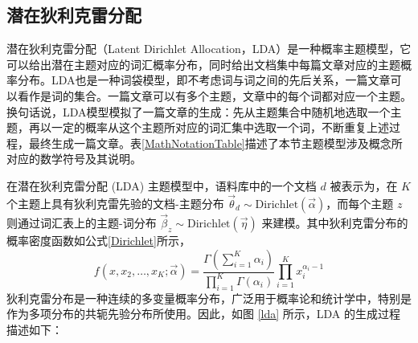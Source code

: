 \subsection{潜在狄利克雷分配}
潜在狄利克雷分配（Latent Dirichlet Allocation，LDA）是一种概率主题模型，它可以给出潜在主题对应的词汇概率分布，同时给出文档集中每篇文章对应的主题概率分布。LDA也是一种词袋模型，即不考虑词与词之间的先后关系，一篇文章可以看作是词的集合。一篇文章可以有多个主题，文章中的每个词都对应一个主题。换句话说，LDA模型模拟了一篇文章的生成：先从主题集合中随机地选取一个主题，再以一定的概率从这个主题所对应的词汇集中选取一个词，不断重复上述过程，最终生成一篇文章。表\ref{MathNotationTable}描述了本节主题模型涉及概念所对应的数学符号及其说明。

\begin{table}[ht]
	\caption{在本章涉及概念对应的数学符号以及其说明}
	    \centering
	\label{MathNotationTable}
\end{table}

在潜在狄利克雷分配 (LDA) 主题模型中，语料库中的一个文档 $d$ 被表示为，在 $K$ 个主题上具有狄利克雷先验的文档-主题分布 $\vec\theta_d \sim \mbox{Dirichlet}(\vec\alpha)$，而每个主题 $z$ 则通过词汇表上的主题-词分布 $\vec\beta_z\sim \mbox{Dirichlet}(\vec\eta)$ 来建模。其中狄利克雷分布的概率密度函数如公式\ref{Dirichlet}所示，
\begin{equation}
    \label{Dirichlet}
    f(x, x_2, \ldots, x_K; \vec\alpha) = \frac{\Gamma(\sum_{i=1}^K \alpha_i)}{\prod_{i=1}^K \Gamma(\alpha_i)} \prod_{i=1}^K x_i^{\alpha_i - 1}
\end{equation}
狄利克雷分布是一种连续的多变量概率分布，广泛用于概率论和统计学中，特别是作为多项分布的共轭先验分布所使用。因此，如图 \ref{lda} 所示，LDA 的生成过程描述如下：

